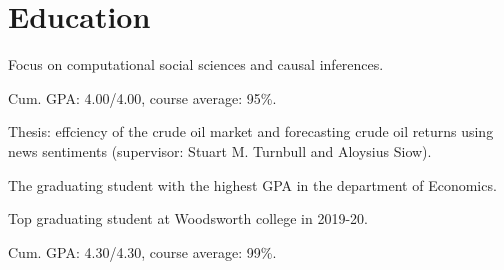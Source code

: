 \documentclass[letterpaper]{deedy-resume} %
\begin{document}
\begin{minipage}[t]{0.66\textwidth} %


\section{Education}


\vspace{\topsep} %
\begin{tightitemize}
\item Focus on computational social sciences and causal inferences.
\end{tightitemize}

\sectionspace %



\begin{tightitemize}
\item Cum. GPA: 4.00/4.00, course average: 95\%.
\item Thesis: effciency of the crude oil market and forecasting crude oil returns using news sentiments (supervisor: Stuart M. Turnbull and Aloysius Siow).
\item The graduating student with the highest GPA in the department of Economics.
\item Top graduating student at Woodsworth college in 2019-20.
\end{tightitemize}

\sectionspace %



\begin{tightitemize}
\item Cum. GPA: 4.30/4.30, course average: 99\%.
\end{tightitemize}


\end{minipage}
\end{document}
